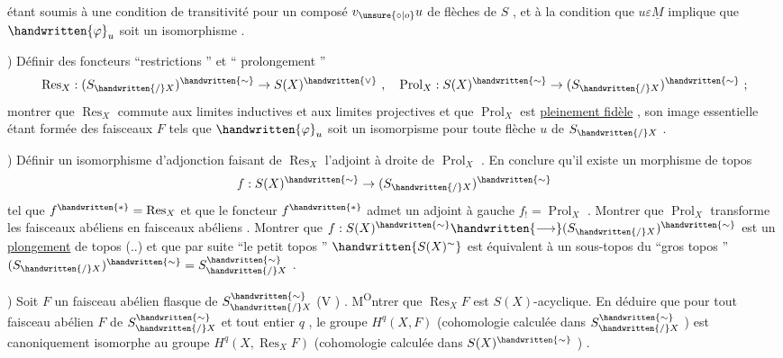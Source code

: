 étant soumis à une condition de transitivité pour un composé \(v_{\unsure{\circ|o}}u\) de flèches de \(S\) , et à la condition que \(u\varepsilon\underline{M}\) implique que \(\handwritten{\varphi}_u\) soit un isomorphisme .

) Définir des foncteurs ``restrictions '' et `` prolongement ''
\[
\operatorname{Res}_X:(S_{\handwritten{/}X})^{\handwritten{\sim}}\to S(X)^{\handwritten{\vee}}\ ,\quad
\operatorname{Prol}_X:S(X)^{\handwritten{\sim}}\to(S_{\handwritten{/}X})^{\handwritten{\sim}}\ ;
\]
montrer que \(\operatorname{Res}_X\) commute aux limites inductives et aux limites projectives et que \(\operatorname{Prol}_X\) est \uline{pleinement fidèle} , son image essentielle étant formée des faisceaux \(F\) tels que \(\handwritten{\varphi}_u\) soit un isomorpisme pour toute flèche \(u\) de  \(S_{\handwritten{/}X}\) .

) Définir un isomorphisme d'adjonction faisant de \(\operatorname{Res}_X\) l'adjoint à droite de \(\operatorname{Prol}_X\) . En conclure qu'il existe un morphisme de topos
\[
f:S(X)^{\handwritten{\sim}}\to(S_{\handwritten{/}X})^{\handwritten{\sim}}
\]
tel que \(f^{\handwritten{*}}=\operatorname{Res}_X\) et que le foncteur \(f^{\handwritten{*}}\) admet un adjoint à gauche \(f_!=\operatorname{Prol}_X\) . Montrer que \(\operatorname{Prol}_X\) transforme les faisceaux abéliens en faisceaux abéliens . Montrer que \(f:S(X)^{\handwritten{\sim}}\handwritten{\longrightarrow}(S_{\handwritten{/}X})^{\handwritten{\sim}}\) est un \uline{plongement} de topos (..) et que par suite ``le petit topos '' \(\handwritten{S(X)^{\sim}}\) est  équivalent à un sous-topos du ``gros topos '' \((S_{\handwritten{/}X})^{\handwritten{\sim}}=S^{\handwritten{\sim}}_{\handwritten{/}X}\) .

) Soit \(F\) un faisceau abélien flasque de \(S^{\handwritten{\sim}}_{\handwritten{/}X}\) (V ) . M\textsuperscript{O}ntrer que \(\operatorname{Res}_X F\) est \(S(X)\)-acyclique\reversemarginpar{}\normalmarginpar . En déduire que pour tout faisceau abélien \(F\) de \(S^{\handwritten{\sim}}_{\handwritten{/}X}\) et tout entier \(q\) , le groupe \(H^q(X,F)\) (cohomologie calculée dans \(S^{\handwritten{\sim}}_{\handwritten{/}X}\) ) est canoniquement isomorphe au groupe \(H^q(X,\operatorname{Res}_X F)\) (cohomologie calculée dans \(S(X)^{\handwritten{\sim}}\) ) .

